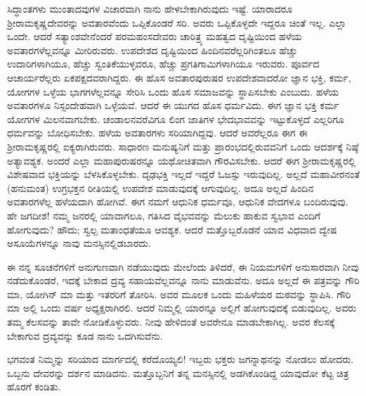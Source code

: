 ಸಿದ್ಧಾಂತಗಳು ಮುಂತಾದವುಗಳ ವಿಚಾರವಾಗಿ ನಾನು ಹೇಳಬೇಕಾಗಿರುವುದು ಇಷ್ಟೆ. ಯಾರಾದರೂ ಶ‍್ರೀರಾಮಕೃಷ್ಣದೇವರನ್ನು ಅವತಾರವೆಂದು ಒಪ್ಪಿಕೊಂಡರೆ ಸರಿ. ಅವರು ಒಪ್ಪಿಕೊಳ್ಳದೇ ಇದ್ದರೂ ಚಿಂತೆ ಇಲ್ಲ. ಎಲ್ಲಾ ಒಂದೇ. ಆದರೆ ಸತ್ಯಾಂಶವೇನೆಂದರೆ ಪರಮಹಂಸದೇವರು ಚಾರಿತ್ರ್ಯ ಮಹತ್ವದ ದೃಷ್ಟಿಯಿಂದ ಹಳೆಯ ಅವತಾರಗಳೆಲ್ಲವನ್ನೂ ಮೀರಿರುವರು. ಉಪದೇಶದ ದೃಷ್ಟಿಯಿಂದ ಹಿಂದಿನವರೆಲ್ಲರಿಗಿಂತಲೂ ಹೆಚ್ಚು ಉದಾರಿಗಳಾಗಿಯೂ, ಹೆಚ್ಚು ಸ್ವಂತಿಕೆಯುಳ್ಳವರೂ, ಹೆಚ್ಚು ಪ್ರಗತಿಗಾಮಿಗಳಾಗಿಯೂ ಇರುವರು. ಪೂರ್ವದ ಆಚಾರ್ಯರೆಲ್ಲರು ಏಕಪಕ್ಷದವರಾಗಿದ್ದರು. ಈ ಹೊಸ ಅವತಾರಪುರುಷರ ಉಪದೇಶವಾದರೋ ಜ್ಞಾನ ಭಕ್ತಿ, ಕರ್ಮ, ಯೋಗಗಳ ಒಳ್ಳೆಯ ಭಾಗಗಳೆಲ್ಲವನ್ನೂ ಸೇರಿಸಿ ಒಂದು ಹೊಸ ಸಮಾಜವನ್ನು ಸ್ಥಾಪಿಸಬೇಕು ಎಂಬುದು. ಹಳೆಯ ಅವತಾರಗಳೂ ನಿಸ್ಸಂದೇಹವಾಗಿ ಒಳ್ಳೆಯವೆ. ಆದರೆ ಈ ಯುಗದ ಹೊಸ ಧರ್ಮವಿದು. ಈಗ ಜ್ಞಾನ ಭಕ್ತಿ ಕರ್ಮ ಯೋಗಗಳ ಮಿಲನವಾಗಬೇಕು. ಚಂಡಾಲನವರೆವಿಗೂ ಲಿಂಗ ಜಾತಿಗಳ ಭೇದಭಾವವನ್ನು ಇಟ್ಟುಕೊಳ್ಳದೆ ಎಲ್ಲರಿಗೂ ಧರ್ಮವನ್ನು ಬೋಧಿಸಬೇಕು. ಹಳೆಯ ಅವತಾರಗಳು ಸರಿಯಾಗಿದ್ದವು. ಆದರೆ ಅವರೆಲ್ಲರೂ ಈಗ ಈ ಶ‍್ರೀರಾಮಕೃಷ್ಣರಲ್ಲಿ ಐಕ್ಯರಾಗಿರುವರು. ಸಾಧಾರಣ ಮನುಷ್ಯನಿಗೆ ಮತ್ತು ಪ್ರಾರಂಭದಲ್ಲಿರುವವನಿಗೆ ಒಂದು ಆದರ್ಶಕ್ಕೆ ನಿಷ್ಠೆ ಅತ್ಯಾವಶ್ಯಕ. ಅಂದರೆ ಎಲ್ಲಾ ಮಹಾಪುರುಷರನ್ನೂ ಯಥೋಚಿತವಾಗಿ ಗೌರವಿಸಬೇಕು. ಆದರೆ ಈಗ ಶ‍್ರೀರಾಮಕೃಷ್ಣರಲ್ಲಿ ವಿಶೇಷವಾದ ಭಕ್ತಿಯನ್ನು ಬೆಳಸಿಕೊಳ್ಳಬೇಕು. ದೃಢಭಕ್ತಿ ಇಲ್ಲದೆ ಇದ್ದರೆ ಓಜಸ್ಸು ಇರುವುದಿಲ್ಲ. ಅಲ್ಲದೆ ಮಹಾವೀರನಂತೆ (ಹನುಮಂತ) ಉಗ್ರಭಕ್ತನ ರೀತಿಯಲ್ಲಿ ಉಪದೇಶ ಮಾಡುವುದಕ್ಕೆ ಆಗುವುದಿಲ್ಲ. ಅದೂ ಅಲ್ಲದೆ ಹಿಂದಿನ ಅವತಾರಗಳೆಲ್ಲ ಹಳೆಯದಾಗಿ ಹೋಗಿವೆ. ಈಗ ನಮಗೆ ಆಧುನಿಕ ಧರ್ಮವೂ, ಆಧುನಿಕ ವೇದಗಳೂ ಬಂದಿರುವುವು. ಹೇ ಜಗದೀಶ! ನಮ್ಮ ಜನರಲ್ಲಿ ಯಾವಾಗಲೂ, ಗತಿಸಿದ ವೈಭವವನ್ನು ಮೆಲುಕು ಹಾಕುವ ಸ್ವಭಾವ ಎಂದಿಗೆ ಹೋಗುವುದು? ಹೌದು; ಸ್ವಲ್ಪ ಮತಾಂಧತೆಯೂ ಆವಶ್ಯಕ. ಆದರೆ ಮತ್ತೊಬ್ಬರೊಡನೆ ಯಾವ ವಿಧವಾದ ದ್ವೇಷ ಅಸೂಯೆಗಳನ್ನೂ ನಾವು ಮನಸ್ಸಿನಲ್ಲಿಡಬಾರದು.

\vspace{0.4cm}

ಈ ನನ್ನ ಸೂಚನೆಗಳಿಗೆ ಅನುಗುಣವಾಗಿ ನಡೆಯುವುದು ಮೇಲೆಂದು ತಿಳಿದರೆ, ಈ ನಿಯಮಗಳಿಗೆ ಅನುಸಾರವಾಗಿ ನೀವು ನಡೆದುಕೊಂಡರೆ, ಇದಕ್ಕೆ ಬೇಕಾದ ದ್ರವ್ಯ ಸಹಾಯವೆಲ್ಲವನ್ನೂ ನಾನು ಮಾಡುವೆನು. ಅದೂ ಅಲ್ಲದೆ ಈ ಪತ್ರವನ್ನು ಗೌರಿ ಮಾ, ಯೋಗಿನ್ ಮಾ ಮತ್ತು ಇತರರಿಗೆ ತೋರಿಸಿ. ಅವರ ಮೂಲಕ ಒಂದು ಮಹಿಳೆಯರ ಮಠವನ್ನು ಸ್ಥಾಪಿಸಿ. ಗೌರಿ ಮಾ ಅಲ್ಲಿ ಒಂದು ವರ್ಷ ಅಧ್ಯಕ್ಷರಾಗಿರಲಿ. ಆದರೆ ನಿಮ್ಮಲ್ಲಿ ಯಾರನ್ನೂ ಅಲ್ಲಿಗೆ ಹೋಗುವುದಕ್ಕೆ ಬಿಡುವುದಿಲ್ಲ. ಅವರು ತಮ್ಮ ಕೆಲಸವನ್ನು ತಾವೇ ನೋಡಿಕೊಳ್ಳುವರು. ನೀವು ಹೇಳಿದಂತೆ ಅವರೇನೂ ಮಾಡಬೇಕಾಗಿಲ್ಲ. ಅವರ ಕೆಲಸಕ್ಕೆ ಬೇಕಾಗುವ ದ್ರವ್ಯವನ್ನು ಕೂಡ ನಾನು ಒದಗಿಸುವೆನು.

\vspace{0.4cm}

ಭಗವಂತ ನಿಮ್ಮನ್ನು ಸರಿಯಾದ ಮಾರ್ಗದಲ್ಲಿ ಕರೆದೊಯ್ಯಲಿ! ಇಬ್ಬರು ಭಕ್ತರು ಜಗನ್ನಾಥನನ್ನು ನೋಡಲು ಹೋದರು. ಒಬ್ಬನು ದೇವರನ್ನು ದರ್ಶನ ಮಾಡಿದನು. ಮತ್ತೊಬ್ಬನಿಗೆ ತನ್ನ ಮನಸ್ಸಿನಲ್ಲಿ ಅಡಗಿಕೊಂಡಿದ್ದ ಯಾವುದೋ ಕೆಟ್ಟ ಚಿತ್ರ ಹೊರಗೆ ಕಂಡಿತು.

\vspace{0.4cm}

